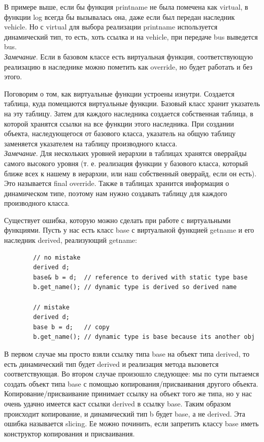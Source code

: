 \documentclass[12pt, a4paper]{article}
\begin{document}
	В примере выше, если бы функция print\textunderscore name не была помечена как virtual, в функции log всегда бы вызывалась она, даже если был передан наследник vehicle. Но с virtual для выбора реализации print\textunderscore name используется динамический тип, то есть, хоть ссылка и на vehicle, при передаче bus выведется bus.\\
	\textit{Замечание}. Если в базовом классе есть виртуальная функция, соответствующую реализацию в наследнике можно пометить как override, но будет работать и без этого.
	\\\par Поговорим о том, как виртуальные функции устроены изнутри. Создается таблица, куда помещаются виртуальные функции. Базовый класс хранит указатель на эту таблицу. Затем для каждого наследника создается собственная таблица, в которой хранятся ссылки на все функции этого наследника. При создании объекта, наследующегося от базового класса, указатель на общую таблицу заменяется указателем на таблицу производного класса.\\
	\textit{Замечание}. Для нескольких уровней иерархии в таблицах хранятся оверрайды самого высокого уровня (т. е. реализация функции у базового класса, который ближе всех к нашему в иерархии, или наш собственный оверрайд, если он есть). Это называется final override. Также в таблицах хранится информация о динамическом типе, поэтому нам нужно создавать таблицу для каждого производного класса.
	\\\par Существует ошибка, которую можно сделать при работе с виртуальными функциями. Пусть у нас есть класс base с виртуальной функцией get\textunderscore name и его наследник derived, реализующий get\textunderscore name:
	\begin{verbatim}
		// no mistake
		derived d;
		base& b = d;  // reference to derived with static type base
		b.get_name(); // dynamic type is derived so derived name
		
		// mistake
		derived d;
		base b = d;   // copy
		b.get_name(); // dynamic type is base because its another obj
	\end{verbatim}
	В первом случае мы просто взяли ссылку типа base на объект типа derived, то есть динамический тип будет derived и реализация метода вызовется соответствующая. Во втором случае произошло следующее: мы по сути пытаемся создать объект типа base с помощью копирования/присваивания другого объекта. Копирование/присваивание принимает ссылку на объект того же типа, но у нас очень удачно имеется каст ссылки derived в ссылку base. Таким образом происходит копирование, и динамический тип b будет base, а не derived. Эта ошибка называется slicing. Ее можно починить, если запретить классу base иметь конструктор копирования и присваивания. 
\end{document}
